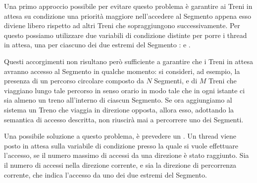 \begin{description}
			Una primo approccio possibile per evitare questo problema è garantire ai Treni in attesa su condizione una priorità maggiore nell'accedere al Segmento appena esso diviene libero rispetto ad altri Treni che sopraggiungono successivamente. Per questo possiamo utilizzare due variabili di condizione distinte per porre i thread in attesa, una per ciascuno dei due estremi del Segmento :  e .
			
			Questi accorgimenti non risultano però sufficiente a garantire che i Treni in attesa avranno accesso al Segmento in qualche momento: si consideri, ad esempio, la presenza di un percorso circolare composto da $N$ Segmenti, e di $M$ Treni che viaggiano lungo tale percorso in senso orario in modo tale che in ogni istante ci sia almeno un treno all'interno di ciascun Segmento. Se ora aggiungiamo al sistema un Treno che viaggia in direzione opposta, allora esso, adottando la semantica di accesso descritta, non riuscirà mai a percorrere uno dei Segmenti.			
			
			Una possibile soluzione a questo problema, è prevedere un . Un thread viene posto in attesa sulla variabile di condizione presso la quale si vuole effettuare l'accesso, se il numero massimo di accessi da una direzione è stato raggiunto. 
		Sia  il numero di accessi nella direzione corrente, e sia  la direzione di percorrenza corrente, che indica l'accesso da uno dei due estremi del Segmento.
		

\end{description}
